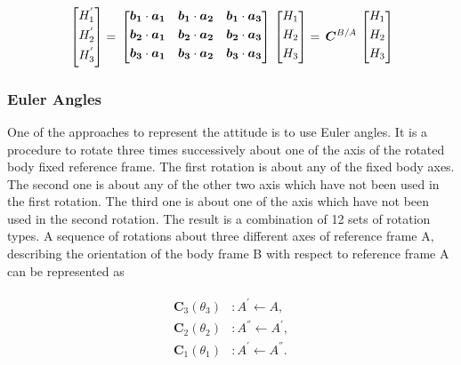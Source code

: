 \begin{equation}{\label{transformVectorH}}
\begin{bmatrix}
H_1^{'}\\[0.3em]
H_2^{'}\\[0.3em]
H_3^{'}\\[0.3em]
\end{bmatrix}
=\,
\begin{bmatrix}
 \bm{b_1} \cdot \bm{a_1}  &  \bm{b_1} \cdot \bm{a_2}  &  \bm{b_1} \cdot \bm{a_3} \\[0.3em]
 \bm{b_2} \cdot \bm{a_1}  & \bm{b_2} \cdot \bm{a_2}  & \bm{b_2} \cdot \bm{a_3} \\[0.3em]
 \bm{b_3} \cdot \bm{a_1}  & \bm{b_3} \cdot \bm{a_2}  &  \bm{b_3} \cdot \bm{a_3} \\[0.3em]
\end{bmatrix}
\,
\begin{bmatrix}
 H_1\\[0.3em]
 H_2\\[0.3em]
 H_3\\[0.3em]
\end{bmatrix}
=\,
\bm{C}^{B/A}
\,
\begin{bmatrix}
H_1\\[0.3em]
H_2\\[0.3em]
H_3\\[0.3em]
\end{bmatrix}
\end{equation} 

\subsubsection{Euler Angles}

One of the approaches to represent the attitude is to use Euler angles. 
It is a procedure to rotate three times successively about one of the axis of the rotated body fixed reference frame. 
The first rotation is about any of the fixed body axes. 
The second one is about any of the other two axis which have not been used in the first rotation. 
The third one is about one of the axis which have not been used in the second rotation. 
The result is a combination of 12 sets of rotation types. 
A sequence of rotations about three different axes of reference frame A, describing the orientation of the body frame B with respect to reference frame A can be represented as

\begin{align}
\label{eqn:sequence}
\begin{split}
{\bm{C}}_3(\theta_{3}) & :      A^{'} \leftarrow A   ,
\\
{\bm{C}}_2(\theta_{2}) & :      A^{''} \leftarrow A^{'}   ,
\\
{\bm{C}}_1(\theta_{1}) & :      A^{'} \leftarrow A^{''}  .
\end{split}
\end{align}

